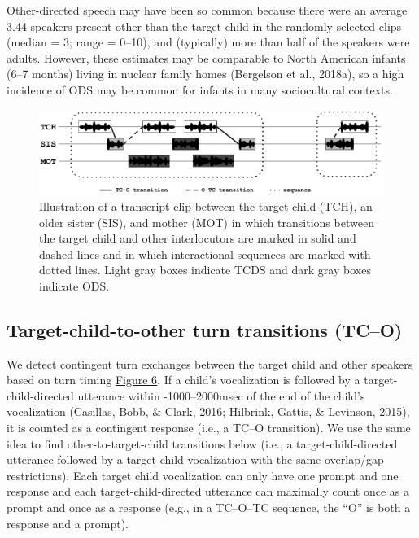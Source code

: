 \documentclass[floatsintext,man]{apa6}
\theoremstyle{definition}
\theoremstyle{definition}
\theoremstyle{definition}
\theoremstyle{remark}
\begin{document}
Other-directed speech may have been so common because there were an
average 3.44 speakers present other than the target child in the
randomly selected clips (median = 3; range = 0--10), and (typically)
more than half of the speakers were adults. However, these estimates may
be comparable to North American infants (6--7 months) living in nuclear
family homes (Bergelson et al., 2018a), so a high incidence of ODS may
be common for infants in many sociocultural contexts.

\begin{figure}
\includegraphics[width=1\linewidth]{Tseltal-CLE_files/TseltalCLE-TurnTimingIllustration} \caption{Illustration of a transcript clip between the target child (TCH), an older sister (SIS), and mother (MOT) in which transitions between the target child and other interlocutors are marked in solid and dashed lines and in which interactional sequences are marked with dotted lines. Light gray boxes indicate TCDS and dark gray boxes indicate ODS.}\label{fig:fig6}
\end{figure}

\subsection{Target-child-to-other turn transitions
(TC--O)}\label{target-child-to-other-turn-transitions-tco}

We detect contingent turn exchanges between the target child and other
speakers based on turn timing \protect\hyperlink{fig6}{Figure 6}. If a
child's vocalization is followed by a target-child-directed utterance
within -1000--2000msec of the end of the child's vocalization (Casillas,
Bobb, \& Clark, 2016; Hilbrink, Gattis, \& Levinson, 2015), it is
counted as a contingent response (i.e., a TC--O transition). We use the
same idea to find other-to-target-child transitions below (i.e., a
target-child-directed utterance followed by a target child vocalization
with the same overlap/gap restrictions). Each target child vocalization
can only have one prompt and one response and each target-child-directed
utterance can maximally count once as a prompt and once as a response
(e.g., in a TC--O--TC sequence, the \enquote{O} is both a response and a
prompt).
\end{document}
